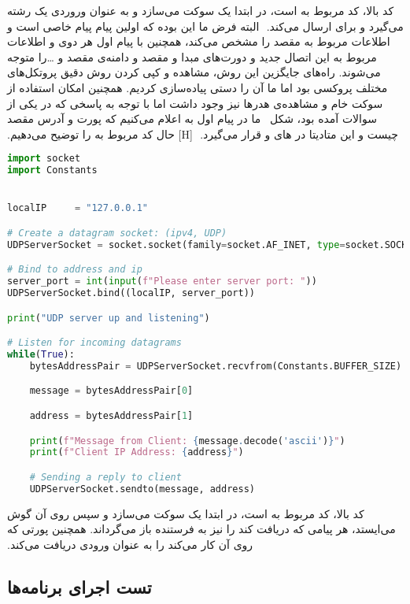 ‫کد بالا، کد مربوط به  است، در ابتدا یک سوکت  می‌سازد و به عنوان وروردی یک رشته می‌گیرد و برای  ارسال می‌کند. 
‫
‫البته فرض ما این بوده که اولین پیام پیام خاصی است و اطلاعات مربوط به مقصد را مشخص می‌کند، همچنین با پیام اول هر دوی  و  اطلاعات مربوط به این اتصال جدید و دورت‌های مبدا و مقصد و دامنه‌ی مقصد و \dots را متوجه می‌شوند. راه‌های جایگزین این روش، مشاهده و کپی کردن روش دقیق پروتکل‌‌های مختلف پروکسی بود اما ما آن را دستی پیاده‌سازی کردیم. همچنین امکان استفاده از سوکت خام و مشاهده‌ی هدرها نیز وجود داشت اما با توجه به پاسخی که در یکی از سوالات آمده بود، شکل~ ما در پیام اول به  اعلام می‌کنیم که پورت و آدرس مقصد چیست و این متادیتا در  های  و  قرار می‌گیرد.
‫
[H]
‫
‫
‫
‫
‫حال کد مربوط به  را توضیح می‌دهیم.
‫
\begin{latin}
\begin{lstlisting}[firstnumber=1, language=Python]
import socket
import Constants


localIP     = "127.0.0.1"

# Create a datagram socket: (ipv4, UDP)
UDPServerSocket = socket.socket(family=socket.AF_INET, type=socket.SOCK_DGRAM)

# Bind to address and ip
server_port = int(input(f"Please enter server port: "))
UDPServerSocket.bind((localIP, server_port))

print("UDP server up and listening")

# Listen for incoming datagrams
while(True):
    bytesAddressPair = UDPServerSocket.recvfrom(Constants.BUFFER_SIZE)

    message = bytesAddressPair[0]

    address = bytesAddressPair[1]

    print(f"Message from Client: {message.decode('ascii')}")
    print(f"Client IP Address: {address}")

    # Sending a reply to client
    UDPServerSocket.sendto(message, address)
\end{lstlisting}
\end{latin}
‫
‫کد بالا، کد مربوط به  است، در ابتدا یک سوکت  می‌سازد و سپس روی آن گوش می‌ایستد، هر پیامی که دریافت کند را نیز به فرستنده باز می‌گرداند. همچنین پورتی که روی آن کار می‌کند را به عنوان ورودی دریافت می‌کند.
‫
‫
‫\subsection{تست اجرای برنامه‌ها}
